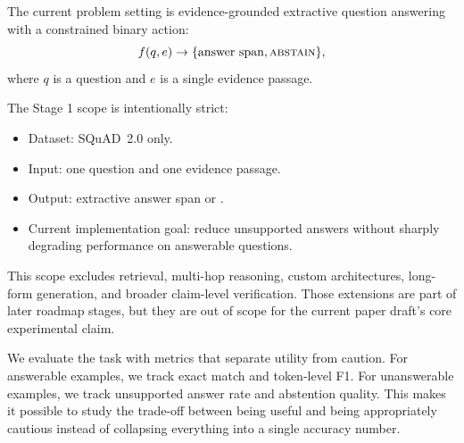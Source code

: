 The current problem setting is evidence-grounded extractive question answering
with a constrained binary action:
\begin{equation}
f(q, e) \rightarrow \{\text{answer span}, \textsc{abstain}\},
\end{equation}
where $q$ is a question and $e$ is a single evidence passage.

The Stage 1 scope is intentionally strict:
\begin{itemize}[leftmargin=1.25em]
  \item Dataset: SQuAD~2.0 only.
  \item Input: one question and one evidence passage.
  \item Output: extractive answer span or \abstain.
  \item Current implementation goal: reduce unsupported answers without sharply
  degrading performance on answerable questions.
\end{itemize}

This scope excludes retrieval, multi-hop reasoning, custom architectures,
long-form generation, and broader claim-level verification.
Those extensions are part of later roadmap stages, but they are out of scope
for the current paper draft's core experimental claim.

We evaluate the task with metrics that separate utility from caution.
For answerable examples, we track exact match and token-level F1.
For unanswerable examples, we track unsupported answer rate and abstention
quality.
This makes it possible to study the trade-off between being useful and being
appropriately cautious instead of collapsing everything into a single accuracy
number.
